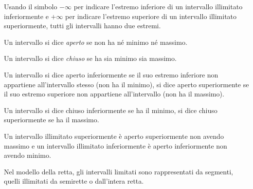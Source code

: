 \vspace{.5em}
Usando il simbolo \(-\infty\) 
per indicare l'estremo inferiore di un intervallo illimitato inferiormente 
e \(+\infty\) 
per indicare l'estremo superiore di un intervallo illimitato superiormente, 
tutti gli intervalli hanno due estremi.

\begin{newdef}{}{}
Un intervallo si dice \emph{aperto} se non ha né minimo né massimo.
\end{newdef}


\begin{newdef}{}{}
Un intervallo si dice \emph{chiuso} se  ha sia minimo sia massimo.
\end{newdef}


\begin{newdef}{}{}
Un intervallo si dice aperto inferiormente se il suo estremo inferiore non 
appartiene all'intervallo stesso (non ha il minimo), 
si dice aperto superiormente se il suo estremo superiore non appartiene 
all'intervallo (non ha il massimo).
\end{newdef}

\begin{newdef}{}{}
Un intervallo si dice chiuso inferiormente se ha il minimo, 
si dice chiuso superiormente se ha il massimo.
\end{newdef}

Un intervallo illimitato superiormente è aperto superiormente non avendo 
massimo e un intervallo illimitato inferiormente è aperto inferiormente non 
avendo minimo.

Nel modello della retta, gli intervalli limitati sono rappresentati da 
segmenti, quelli illimitati da semirette o dall'intera retta.

